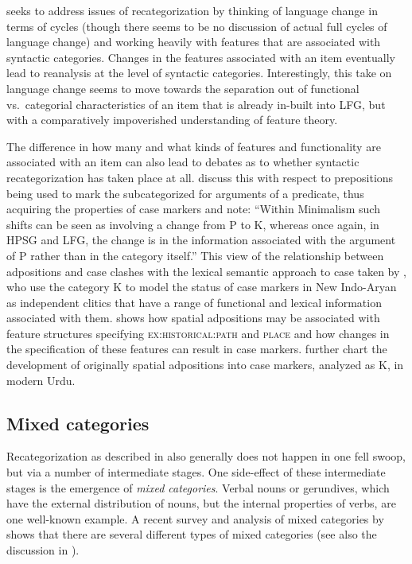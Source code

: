 \documentclass[output=paper,hidelinks]{langscibook}
\begin{document}
 seeks to address issues of recategorization by thinking of language change in terms of cycles (though there seems to be no discussion of actual full cycles of language change) and working heavily with features that are associated with syntactic categories. Changes in the features associated with an item eventually lead to reanalysis at the level of syntactic categories. Interestingly, this take on language change seems to move towards the separation out of functional vs.~categorial characteristics of an item that is already in-built into LFG, but with a comparatively impoverished understanding of feature theory. 

The difference in how many and what kinds of features and functionality are associated with an item can also lead to debates as to whether syntactic recategorization has taken place at all.  \citet[144]{vincent2020heads} discuss this with respect to prepositions being used to mark the  subcategorized for arguments of a predicate, thus acquiring the properties of case markers and note: ``Within Minimalism such shifts can be seen as involving a change from P to K, whereas once again, in
HPSG and LFG, the change is in the information associated with the argument of P rather than in the category itself.''  This view of the relationship between adpositions and case clashes with the lexical semantic approach to case taken by  \citet{buttking91,buttking03-case,buttking05}, who use the category K to model the status of case markers in New Indo-Aryan as independent clitics that have a range of functional and lexical information associated with them.  \citet{ahmed09} shows how spatial adpositions may be associated with feature structures specifying \textsc{ex:historical:path} and \textsc{place} and how changes in the specification of these features can result in case markers.  \citet{buttahmed11} further chart the development of originally spatial adpositions into case markers, analyzed as K, in modern Urdu.



\subsection{Mixed categories}
\label{sec:historical:mixed}

Recategorization as described in  also generally does not happen in one fell swoop, but via a number of intermediate stages.  One side-effect of these intermediate stages is the emergence of \textit{mixed categories}.  Verbal nouns or gerundives, which have the external distribution of nouns, but the internal properties of verbs, are one well-known example.  A recent survey and analysis of mixed categories by \citet{nikolaeva-spencer20} shows that there are several different types of mixed categories (see also the discussion in \citealt{lowe16}).
\end{document}
